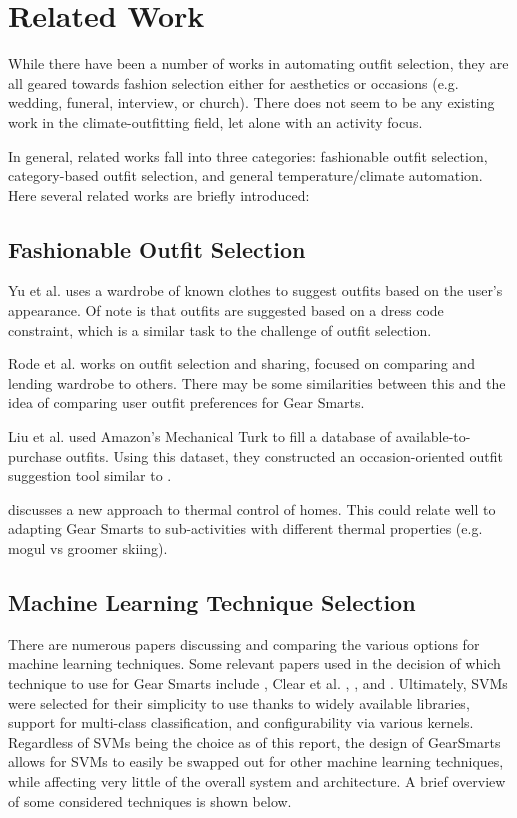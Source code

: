 \section{Related Work}
\label{section:relatedwork}
While there have been a number of works in automating outfit selection, they are all geared towards
fashion selection either for aesthetics or occasions (e.g. wedding, funeral, interview, or church).
There does not seem to be any existing work in the climate-outfitting field, let alone with an
activity focus.

In general, related works fall into three categories: fashionable outfit selection, category-based
outfit selection, and general temperature/climate automation. Here several related works are briefly introduced:

\subsection{Fashionable Outfit Selection}
Yu et al. \cite{Dressup} uses a wardrobe of known clothes to suggest outfits based on the user's appearance.
Of note is that outfits are suggested based on a dress code constraint, which is a similar task to
the challenge of outfit selection.

Rode et al. \cite{SmartCloset} works on outfit selection and sharing, focused on comparing and lending wardrobe
to others. There may be some similarities between this and the idea of comparing user outfit preferences
for Gear Smarts.

Liu et al. \cite{MagicCloset} used Amazon's Mechanical Turk to fill a database of available-to-purchase outfits.
Using this dataset, they constructed an occasion-oriented outfit suggestion tool similar to \cite{Dressup}.

\cite{ThermalComfort} discusses a new approach to thermal control of homes. This could relate well to
adapting Gear Smarts to sub-activities with different thermal properties (e.g. mogul vs groomer skiing).

\subsection{Machine Learning Technique Selection}
There are numerous papers discussing and comparing the various options for machine learning techniques.
Some relevant papers used in the decision of which technique to use for Gear Smarts include \cite{ML:MapReduceClusters},
Clear et al. \cite{ML:ManufacturingSystems}, \cite{ML:IPTraffic}, and \cite{ML:GeoMapping}. Ultimately, SVMs were selected
for their simplicity to use thanks to widely available libraries, support for multi-class classification, and configurability
via various kernels. Regardless of SVMs being the choice as of this report, the design of GearSmarts allows for SVMs
to easily be swapped out for other machine learning techniques, while affecting very little of the overall system and
architecture. A brief overview of some considered techniques is shown below.

